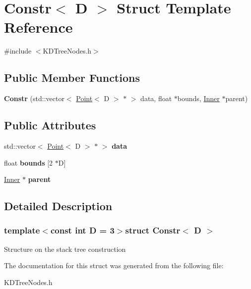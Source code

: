 \hypertarget{structConstr}{\section{Constr$<$ D $>$ Struct Template Reference}
\label{structConstr}
}


{\ttfamily \#include $<$K\-D\-Tree\-Nodes.\-h$>$}

\subsection*{Public Member Functions}
\begin{DoxyCompactItemize}
\item 
\hypertarget{structConstr_a60809b47727397a0bfb76fe006a02678}{{\bfseries Constr} (std\-::vector$<$ \hyperlink{structPoint}{Point}$<$ D $>$ $\ast$ $>$ data, float $\ast$bounds, \hyperlink{structInner}{Inner} $\ast$parent)}\label{structConstr_a60809b47727397a0bfb76fe006a02678}

\end{DoxyCompactItemize}
\subsection*{Public Attributes}
\begin{DoxyCompactItemize}
\item 
\hypertarget{structConstr_a19695b7cc11fdc3e97876442d3391619}{std\-::vector$<$ \hyperlink{structPoint}{Point}$<$ D $>$ $\ast$ $>$ {\bfseries data}}\label{structConstr_a19695b7cc11fdc3e97876442d3391619}

\item 
\hypertarget{structConstr_acdb6f4c82d77767124fcbb55891c0ad1}{float {\bfseries bounds} \mbox{[}2 $\ast$D\mbox{]}}\label{structConstr_acdb6f4c82d77767124fcbb55891c0ad1}

\item 
\hypertarget{structConstr_a9ea5785c42fa3eadf7b314ed34b73eaa}{\hyperlink{structInner}{Inner} $\ast$ {\bfseries parent}}\label{structConstr_a9ea5785c42fa3eadf7b314ed34b73eaa}

\end{DoxyCompactItemize}


\subsection{Detailed Description}
\subsubsection*{template$<$const int D = 3$>$struct Constr$<$ D $>$}

Structure on the stack tree construction 

The documentation for this struct was generated from the following file\-:\begin{DoxyCompactItemize}
\item 
K\-D\-Tree\-Nodes.\-h\end{DoxyCompactItemize}

